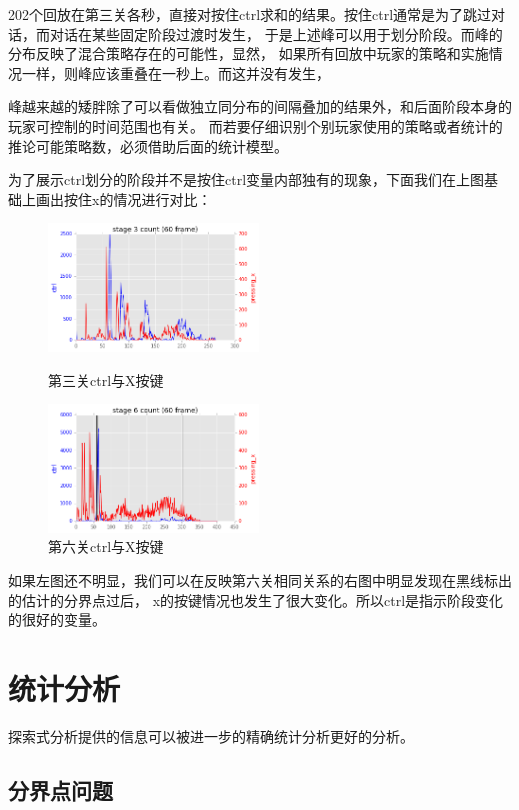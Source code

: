 \documentclass[UTF8]{ctexart}
\begin{document}
202个回放在第三关各秒，直接对按住ctrl求和的结果。按住ctrl通常是为了跳过对话，而对话在某些固定阶段过渡时发生，
于是上述峰可以用于划分阶段。而峰的分布反映了混合策略存在的可能性，显然，
如果所有回放中玩家的策略和实施情况一样，则峰应该重叠在一秒上。而这并没有发生，

峰越来越的矮胖除了可以看做独立同分布的间隔叠加的结果外，和后面阶段本身的玩家可控制的时间范围也有关。
而若要仔细识别个别玩家使用的策略或者统计的推论可能策略数，必须借助后面的统计模型。

为了展示ctrl划分的阶段并不是按住ctrl变量内部独有的现象，下面我们在上图基础上画出按住x的情况进行对比：

\begin{figure}[H]
\begin{minipage}[t]{0.5\linewidth}
\centering
\includegraphics[width=2.2in]{images/sumCtrlX.png}
\caption{第三关ctrl与X按键}
\end{minipage}%
\begin{minipage}[t]{0.5\linewidth}
\centering
\includegraphics[width=2.2in]{images/sumCtrlX2.png}
\caption{第六关ctrl与X按键}
\end{minipage}
\end{figure}

如果左图还不明显，我们可以在反映第六关相同关系的右图中明显发现在黑线标出的估计的分界点过后，
x的按键情况也发生了很大变化。所以ctrl是指示阶段变化的很好的变量。

\section{统计分析}

探索式分析提供的信息可以被进一步的精确统计分析更好的分析。

\subsection{分界点问题}
\end{document}
